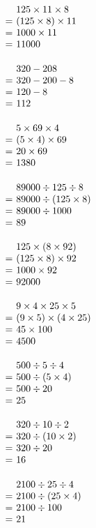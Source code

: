 \documentclass[UTF8]{ctexart}
\makeatletter
\newcommand{\cell}[2]{%
  \begin{minipage}[t][35mm][t]{0.315\textwidth}%
    \vspace{0pt}\linespread{1}#1\selectfont
    \strut#2%
  \end{minipage}%
}
\newcommand{\arow}[3]{%
  \noindent\cell{\zihao{-4}}{#1}\hfill
  \cell{\zihao{-4}}{#2}\hfill
  \cell{\zihao{-4}}{#3}\par\nointerlineskip
}
\newcommand{\eqgap}{0.35em}
\newcommand{\problemline}[1]{#1}
\newcommand{\solution}[1]{%
  \(\begin{array}[t]{@{}r@{\hspace{\eqgap}}l@{}}#1\end{array}\)%
}
\makeatother
\begin{document}
\arow
{\solution{
& \problemline{125\times 11\times 8} \\
= & (125\times 8)\times 11 \\
= & 1000\times 11 \\
= & 11000
}}
{\solution{
& \problemline{320-208} \\
= & 320-200-8 \\
= & 120-8 \\
= & 112
}}
{\solution{
& \problemline{5\times 69\times 4} \\
= & (5\times 4)\times 69 \\
= & 20\times 69 \\
= & 1380
}}
\arow
{\solution{
& \problemline{89000\div 125\div 8} \\
= & 89000\div (125\times 8) \\
= & 89000\div 1000 \\
= & 89
}}
{\solution{
& \problemline{125\times (8\times 92)} \\
= & (125\times 8)\times 92 \\
= & 1000\times 92 \\
= & 92000
}}
{\solution{
& \problemline{9\times 4\times 25\times 5} \\
= & (9\times 5)\times (4\times 25) \\
= & 45\times 100 \\
= & 4500
}}
\arow
{\solution{
& \problemline{500\div 5\div 4} \\
= & 500\div (5\times 4) \\
= & 500\div 20 \\
= & 25
}}
{\solution{
& \problemline{320\div 10\div 2} \\
= & 320\div (10\times 2) \\
= & 320\div 20 \\
= & 16
}}
{\solution{
& \problemline{2100\div 25\div 4} \\
= & 2100\div (25\times 4) \\
= & 2100\div 100 \\
= & 21
}}

\newpage
\end{document}

